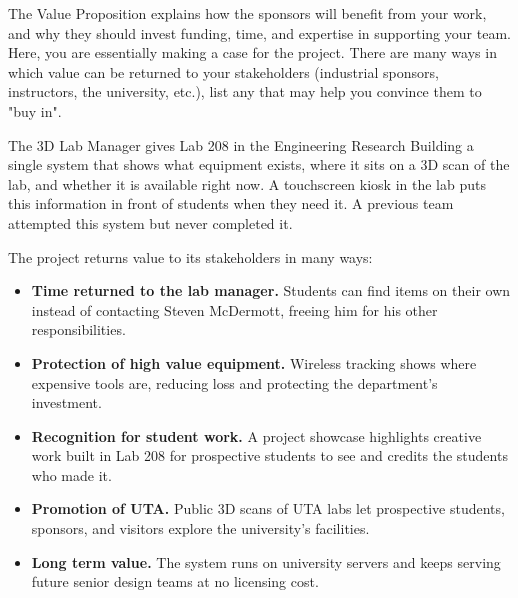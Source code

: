 The Value Proposition explains how the sponsors will benefit from your work, and why they should invest funding, time, and expertise in supporting your team. Here, you are essentially making a case for the project. There are many ways in which value can be returned to your stakeholders (industrial sponsors, instructors, the university, etc.), list any that may help you convince them to "buy in".

The 3D Lab Manager gives Lab 208 in the Engineering Research Building a single system that shows what equipment exists,
where it sits on a 3D scan of the lab, and whether it is available right now. 
A touchscreen kiosk in the lab puts this information in front of students when they need it. 
A previous team attempted this system but never completed it.

The project returns value to its stakeholders in many ways:

\begin{itemize}
    \item \textbf{Time returned to the lab manager.}
    Students can find items on their own instead of contacting
    Steven McDermott, freeing him for his other responsibilities.

    \item \textbf{Protection of high value equipment.}
    Wireless tracking shows where expensive tools are, reducing
    loss and protecting the department's investment.

    \item \textbf{Recognition for student work.}
    A project showcase highlights creative work built in Lab 208 for prospective students to see
    and credits the students who made it.

    \item \textbf{Promotion of UTA.}
    Public 3D scans of UTA labs let prospective students,
    sponsors, and visitors explore the university's facilities.

    \item \textbf{Long term value.}
    The system runs on university servers and keeps serving
    future senior design teams at no licensing cost.
\end{itemize}